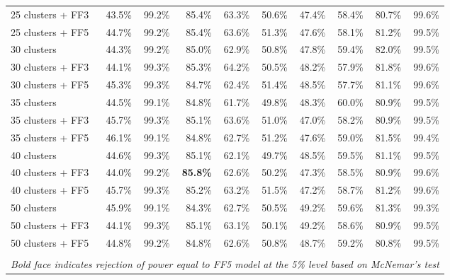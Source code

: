 \begin{table}[!h]
\begin{center}
\begin{tabular}{lrrrrrrrrr}
25 clusters + FF3	& 43.5\% & 99.2\% & 85.4\% & 63.3\% & 50.6\% & 47.4\% & 58.4\% & 80.7\% & 99.6\% \\
25 clusters + FF5	& 44.7\% & 99.2\% & 85.4\% & 63.6\% & 51.3\% & 47.6\% & 58.1\% & 81.2\% & 99.5\% \\
30 clusters	& 44.3\% & 99.2\% & 85.0\% & 62.9\% & 50.8\% & 47.8\% & 59.4\% & 82.0\% & 99.5\% \\
30 clusters + FF3	& 44.1\% & 99.3\% & 85.3\% & 64.2\% & 50.5\% & 48.2\% & 57.9\% & 81.8\% & 99.6\% \\
30 clusters + FF5	& 45.3\% & 99.3\% & 84.7\% & 62.4\% & 51.4\% & 48.5\% & 57.7\% & 81.1\% & 99.6\% \\
35 clusters	& 44.5\% & 99.1\% & 84.8\% & 61.7\% & 49.8\% & 48.3\% & 60.0\% & 80.9\% & 99.5\% \\
35 clusters + FF3	& 45.7\% & 99.3\% & 85.1\% & 63.6\% & 51.0\% & 47.0\% & 58.2\% & 80.9\% & 99.5\% \\
35 clusters + FF5	& 46.1\% & 99.1\% & 84.8\% & 62.7\% & 51.2\% & 47.6\% & 59.0\% & 81.5\% & 99.4\% \\
40 clusters	& 44.6\% & 99.3\% & 85.1\% & 62.1\% & 49.7\% & 48.5\% & 59.5\% & 81.1\% & 99.5\% \\
40 clusters + FF3	& 44.0\% & 99.2\% & \textbf{85.8\%} & 62.6\% & 50.2\% & 47.3\% & 58.5\% & 80.9\% & 99.6\% \\
40 clusters + FF5	& 45.7\% & 99.3\% & 85.2\% & 63.2\% & 51.5\% & 47.2\% & 58.7\% & 81.2\% & 99.6\% \\
50 clusters	& 45.9\% & 99.1\% & 84.3\% & 62.7\% & 50.5\% & 49.2\% & 59.6\% & 81.3\% & 99.3\% \\
50 clusters + FF3	& 44.1\% & 99.3\% & 85.1\% & 63.1\% & 50.1\% & 49.2\% & 58.6\% & 80.9\% & 99.5\% \\
50 clusters + FF5	& 44.8\% & 99.2\% & 84.8\% & 62.6\% & 50.8\% & 48.7\% & 59.2\% & 80.8\% & 99.5\% \\
\hline\\
\multicolumn{10}{l}{\itshape Bold face indicates rejection of power equal to FF5 model at the 5\% level based on McNemar's test}
    \end{tabular}
    \end{center}
\end{table}
